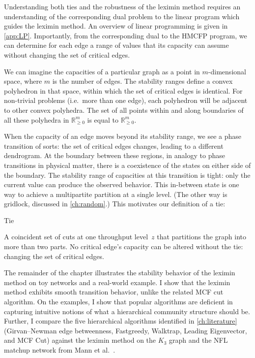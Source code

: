 Understanding both ties and the robustness of the leximin method requires an understanding of the corresponding dual problem to the linear program which guides the leximin method. An overview of linear programming is given in \autoref{app:LP}. Importantly, from the corresponding dual to the HMCFP program, we can determine for each edge a range of values that its capacity can assume without changing the set of critical edges.

We can imagine the capacities of a particular graph as a point in $m$-dimensional space, where $m$ is the number of edges. The stability ranges define a convex polyhedron in that space, within which the set of critical edges is identical. For non-trivial problems (i.e.\ more than one edge), each polyhedron will be adjacent to other convex polyhedra. The set of all points within and along boundaries of all these polyhedra in $\mathbb{R}_{\geq 0}^m$ is equal to $\mathbb{R}_{\geq 0}^m$.

When the capacity of an edge moves beyond its stability range, we see a phase transition of sorts: the set of critical edges changes, leading to a different dendrogram. At the boundary between these regions, in analogy to phase transitions in physical matter, there is a coexistence of the states on either side of the boundary. The stability range of capacities at this transition is tight: only the current value can produce the observed behavior. This in-between state is one way to achieve a multipartite partition at a single level. (The other way is gridlock, discussed in \autoref{ch:random}.) This motivates our definition of a tie:

\begin{definition}{Tie} \label{def:tie}

A coincident set of cuts at one throughput level~$z$ that partitions the graph into more than two parts. No critical edge's capacity can be altered without  the tie: changing the set of critical edges.
\end{definition}

The remainder of the chapter illustrates the stability behavior of the leximin method on toy networks and a real-world example. I show that the leximin method exhibits smooth transition behavior, unlike the related MCF cut algorithm. On the examples, I show that popular algorithms are deficient in capturing intuitive notions of what a hierarchical community structure should be. Further, I compare the five hierarchical algorithms identified in \autoref{ch:literature} (Girvan--Newman edge betweenness, Fastgreedy, Walktrap, Leading Eigenvector, and MCF Cut) against the leximin method on the $K_3$ graph and the NFL matchup network from Mann et al.~\cite{mann2008sparsest}.




